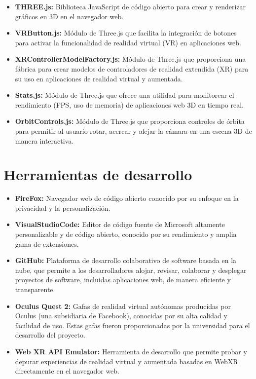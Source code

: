 \documentclass[a4paper, 12pt]{book}
\begin{document}
\begin{itemize}
  \item \textbf{THREE.js:} Biblioteca JavaScript de código abierto para crear y renderizar gráficos en 3D en el navegador web.
  
  \item \textbf{VRButton.js:} Módulo de Three.js que facilita la integración de botones para activar la funcionalidad de realidad virtual (VR) en aplicaciones web.
  
  \item \textbf{XRControllerModelFactory.js:} Módulo de Three.js que proporciona una fábrica para crear modelos de controladores de realidad extendida (XR) para 
  su uso en aplicaciones de realidad virtual y aumentada.

  \item \textbf{Stats.js:} Módulo de Three.js que ofrece una utilidad para monitorear el rendimiento (FPS, uso de memoria) de aplicaciones web 3D en tiempo real.
  
  \item \textbf{OrbitControls.js:} Módulo de Three.js que proporciona controles de órbita para permitir al usuario rotar, acercar y alejar la cámara en una escena 3D de manera interactiva.
  
\end{itemize}


\section{Herramientas de desarrollo} 
\label{sec:herramientas}

\begin{itemize}
  \item \textbf{FireFox:} Navegador web de código abierto conocido por su enfoque en la privacidad y la personalización.
  
  \item \textbf{VisualStudioCode:} Editor de código fuente de Microsoft altamente personalizable y de código abierto, conocido 
  por su rendimiento y amplia gama de extensiones.
  
  \item \textbf{GitHub:} Plataforma de desarrollo colaborativo de software basada en la nube, que permite a los desarrolladores alojar, revisar, 
  colaborar y desplegar proyectos de software, incluidas aplicaciones web, de manera eficiente y transparente.

  \item \textbf{Oculus Quest 2:} Gafas de realidad virtual autónomas producidas por Oculus (una subsidiaria de Facebook), conocidas 
  por su alta calidad y facilidad de uso. Estas gafas fueron proporcionadas por la universidad para el desarrollo del proyecto.
  
  \item \textbf{Web XR API Emulator:} Herramienta de desarrollo que permite probar y depurar experiencias de realidad virtual y aumentada 
  basadas en WebXR directamente en el navegador web. 
  
\end{itemize}
\end{document}
